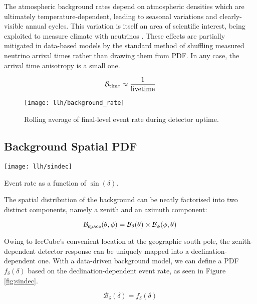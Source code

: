 The atmospheric background rates depend on atmospheric densities which are ultimately temperature-dependent, leading to seasonal variations and clearly-visible annual cycles. This variation is itself an area of scientific interest, being exploited to measure climate with neutrinos . These effects are partially mitigated in data-based models by the standard method of shuffling measured neutrino arrival times rather than drawing them from PDF. In any case, the arrival time anisotropy is a small one.

\begin{equation}
\mathcal{B}_{\textup{time}} \approx \frac{1}{\textup{livetime}}
\end{equation}

\begin{figure}[!ht]
	\centering \texttt{[image: llh/background\_rate]}
	\caption{Rolling average of final-level event rate during detector uptime.}
	\label{fig:background_rate}
\end{figure}

\subsection{Background Spatial PDF}

\begin{marginfigure}
	\centering \texttt{[image: llh/sindec]}
	\caption{Event rate as a function of $\sin(\delta)$.}
	\label{fig:sindec}
\end{marginfigure}

The spatial distribution of the background can be neatly factorised into two distinct components, namely a zenith and an azimuth component:

\begin{equation}
	\mathcal{B}_{\textup{space}} (\theta, \phi) = \mathcal{B}_{\theta}(\theta) \times \mathcal{B}_{\phi}(\phi, \theta)
	\label{eq:b_space_local}
\end{equation}

Owing to IceCube's convenient location at the geographic south pole, the zenith-dependent detector response can be uniquely mapped into a declination-dependent one. With a data-driven background model, we can define a PDF $f_{\delta}(\delta)$ based on the declination-dependent event rate, as seen in Figure \ref{fig:sindec}.

\begin{equation}
	\mathcal{B}_{\delta}(\delta) = f_{\delta}(\delta)
	\label{eq:b_theta}
\end{equation}

